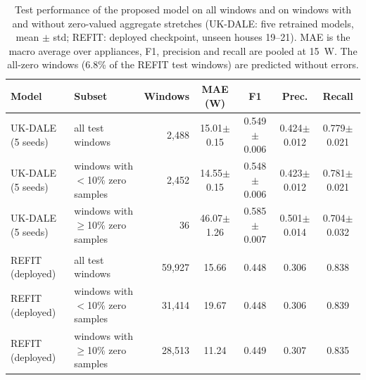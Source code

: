 \begin{table}[H]
\centering
\caption{Test performance of the proposed model on all windows and on windows with and without zero-valued aggregate stretches (UK-DALE: five retrained models, mean $\pm$ std; REFIT: deployed checkpoint, unseen houses 19--21). MAE is the macro average over appliances, F1, precision and recall are pooled at 15~W. The all-zero windows (6.8\% of the REFIT test windows) are predicted without errors.}
\label{tab:gap_eval}
\footnotesize
\begin{tabular}{@{}llrcccc@{}}
\toprule
Model & Subset & Windows & MAE (W) & F1 & Prec. & Recall \\
\midrule
UK-DALE (5 seeds) & all test windows & 2{,}488 & 15.01$\pm$0.15 & 0.549$\pm$0.006 & 0.424$\pm$0.012 & 0.779$\pm$0.021 \\
UK-DALE (5 seeds) & windows with $<$10\% zero samples & 2{,}452 & 14.55$\pm$0.15 & 0.548$\pm$0.006 & 0.423$\pm$0.012 & 0.781$\pm$0.021 \\
UK-DALE (5 seeds) & windows with $\geq$10\% zero samples & 36 & 46.07$\pm$1.26 & 0.585$\pm$0.007 & 0.501$\pm$0.014 & 0.704$\pm$0.032 \\
\midrule \\
REFIT (deployed) & all test windows & 59{,}927 & 15.66 & 0.448 & 0.306 & 0.838 \\
REFIT (deployed) & windows with $<$10\% zero samples & 31{,}414 & 19.67 & 0.448 & 0.306 & 0.839 \\
REFIT (deployed) & windows with $\geq$10\% zero samples & 28{,}513 & 11.24 & 0.449 & 0.307 & 0.835 \\
\bottomrule
\end{tabular}
\end{table}


